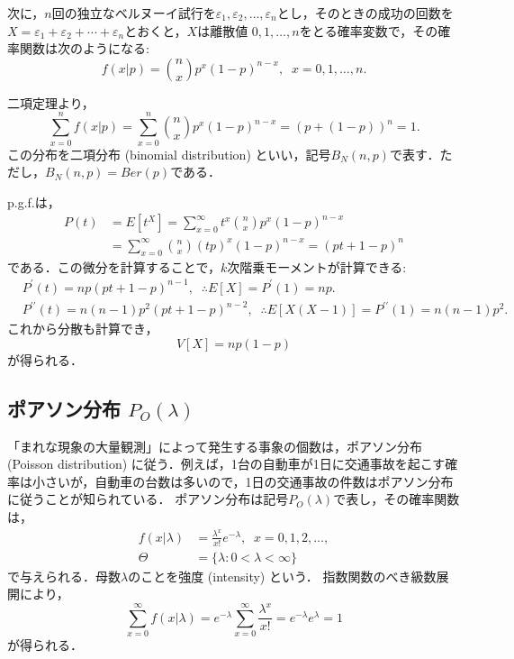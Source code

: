 \documentclass{jsreport}
\begin{document}
次に，$n$回の独立なベルヌーイ試行を$\varepsilon_1, \varepsilon_2, \ldots, \varepsilon_n$とし，そのときの成功の回数を$X = \varepsilon_1 + \varepsilon_2 + \cdots + \varepsilon_n$とおくと，$X$は離散値
$0, 1, \ldots, n$をとる確率変数で，その確率関数は次のようになる:
\begin{equation}
  f(x|p) = \binom{n}{x} p^x (1 - p)^{n - x}, \; \; x = 0, 1, \ldots, n. \nonumber
\end{equation}

二項定理より，
\begin{equation}
  \sum_{x = 0}^n f(x|p) = \sum_{x = 0}^n \binom{n}{x} p^x (1 - p)^{n - x} = (p + (1 - p))^n = 1. \nonumber
\end{equation}
この分布を二項分布 (binomial distribution) といい，記号$B_N(n, p)$で表す．ただし，$B_N(n, p) = Ber(p)$である．

p.g.f.は，
\begin{align}
  P(t) &= E[t^X] = \sum_{x = 0}^{\infty} t^x \binom{n}{x} p^x (1 - p)^{n - x} \nonumber \\
  &= \sum_{x = 0}^{\infty} \binom{n}{x} (tp)^x (1 - p)^{n - x} = (pt + 1 - p)^n \nonumber
\end{align}
である．この微分を計算することで，$k$次階乗モーメントが計算できる:
\begin{align}
  &P^{\prime}(t) = np(pt + 1 - p)^{n - 1}, \; \; \therefore E[X] = P^{\prime}(1) = np. \nonumber \\
  &P^{\prime \prime}(t) = n(n - 1)p^2(pt + 1 - p)^{n - 2}, \; \; \therefore E[X(X - 1)] = P^{\prime \prime}(1) = n(n - 1)p^2. \nonumber
\end{align}
これから分散も計算でき，
\begin{equation}
  V[X] = np(1 - p) \nonumber
\end{equation}
が得られる．

\subsection{ポアソン分布 $P_O(\lambda)$}
「まれな現象の大量観測」によって発生する事象の個数は，ポアソン分布 (Poisson distribution) に従う．例えば，1台の自動車が1日に交通事故を起こす確率は小さいが，自動車の台数は多いので，1日の交通事故の件数はポアソン分布に従うことが知られている．
ポアソン分布は記号$P_O(\lambda)$で表し，その確率関数は，
\begin{align}
  f(x | \lambda) &= \frac{\lambda^x}{x!} e^{-\lambda}, \; \; x = 0, 1, 2, \ldots, \nonumber \\
  \Theta &= \{\lambda : 0 < \lambda < \infty\} \nonumber
\end{align}
で与えられる．母数$\lambda$のことを強度 (intensity) という．
指数関数のべき級数展開により，
\begin{equation}
  \sum_{x = 0}^{\infty} f(x | \lambda) = e^{-\lambda} \sum_{x = 0}^{\infty} \frac{\lambda^x}{x!} = e^{-\lambda}e^{\lambda} = 1 \nonumber
\end{equation}
が得られる．
\end{document}
